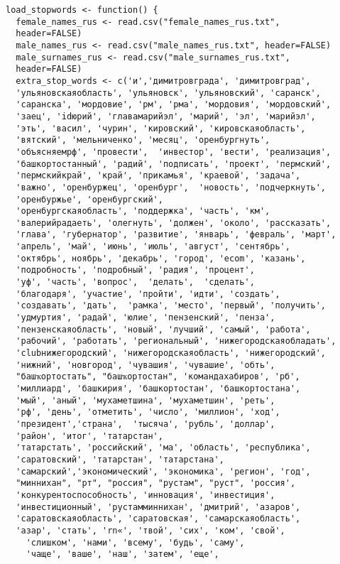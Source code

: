 \documentclass[bachelor, och, diploma ]{SCWorks}
\begin{document}
\begin{verbatim}
load_stopwords <- function() {
  female_names_rus <- read.csv("female_names_rus.txt",
  header=FALSE)
  male_names_rus <- read.csv("male_names_rus.txt", header=FALSE)
  male_surnames_rus <- read.csv("male_surnames_rus.txt",
  header=FALSE)
  extra_stop_words <- c('и','димитровграда', 'димитровград',
  'ульяновскаяобласть', 'ульяновск', 'ульяновский', 'саранск', 
  'саранска', 'мордовие', 'рм', 'рма', 'мордовия', 'мордовский', 
  'заец', 'idюрий', 'главамарийэл', 'марий', 'эл', 'марийэл', 
  'эть', 'васил', 'чурин', 'кировский', 'кировскаяобласть',
  'вятский', 'мельниченко', 'месяц', 'оренбургнуть', 
  'объясняемрф', 'провести',  'инвестор', 'вести', 'реализация', 
  'башкортостанный', 'радий', 'подписать', 'проект', 'пермский', 
  'пермскийкрай', 'край', 'прикамья', 'краевой', 'задача', 
  'важно', 'оренбуржец', 'оренбург',  'новость', 'подчеркнуть', 
  'оренбуржье', 'оренбургский', 
  'оренбургскаяобласть', 'поддержка', 'часть', 'км', 
  'валерийрадаеть', 'олегнуть', 'должен', 'около', 'рассказать', 
  'глава', 'губернатор', 'развитие', 'январь', 'февраль', 'март', 
  'апрель', 'май', 'июнь', 'июль', 'август', 'сентябрь', 
  'октябрь', ноябрь', 'декабрь', 'город', 'ecom', 'казань', 
  'подробность', 'подробный', 'радия', 'процент', 
  'уф', 'часть', 'вопрос',  'делать',  'сделать',
  'благодаря', 'участие', 'пройти', 'идти', 'создать', 
  'создавать', 'дать',  'рамка', 'место', 'первый', 'получить', 
  'удмуртия', 'радай', 'юлие', 'пензенский', 'пенза', 
  'пензенскаяобласть', 'новый', 'лучший', 'самый', 'работа', 
  'рабочий', 'работать', 'региональный', 'нижегородскаяобладать', 
  'clubнижегородский', 'нижегородскаяобласть', 'нижегородский', 
  'нижний', 'новгород', 'чувашия', 'чувашие', 'обть', 
  "бaшҡортостать", "бaшҡортостан", 'командахабиров', 'рб', 
  'миллиард', 'башкирия', 'башкортостан', 'башкортостана', 
  'мый', 'аный', 'мухаметшина', 'мухаметшин', 'реть', 
  'рф', 'день', 'отметить', 'число', 'миллион', 'ход', 
  'президент','страна',  'тысяча', 'рубль', 'доллар', 
  'район', 'итог', 'татарстан', 
  'татарстать', 'российский', 'ма', 'область', 'республика', 
  'саратовский', 'татарстан', 'татарстана', 
  'самарский','экономический', 'экономика', 'регион', 'год', 
  "миннихан", "рт", "россия", "рустам", "руст", 'россия', 
  'конкурентоспособность', 'инновация', 'инвестиция', 
  'инвестиционный', 'рустамминнихан', 'дмитрий', 'азаров', 
  'саратовскаяобласть', 'саратовская', 'самарскаяобласть', 
  'азар', 'стать', 'rn«', 'твой', 'сих', 'ком', 'свой',
    'слишком', 'нами', 'всему', 'будь', 'саму', 
    'чаще', 'ваше', 'наш', 'затем', 'еще', 

\end{verbatim}
\end{document}
